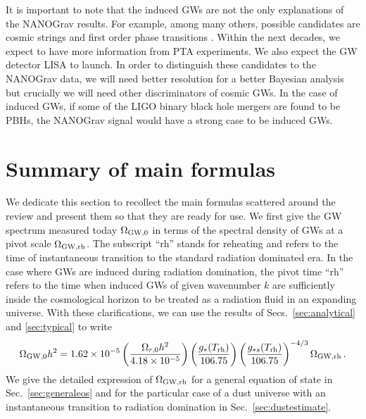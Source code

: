 \documentclass[a4paper,11pt]{article}
\numberwithin{equation}{section}
\begin{document}
It is important to note that the induced GWs are not the only explanations of the NANOGrav results. For example, among many others, possible candidates are cosmic strings \cite{Ellis:2020ena,Blasi:2020mfx,Buchmuller:2020lbh,Samanta:2020cdk} and first order phase transitions \cite{Nakai:2020oit,Addazi:2020zcj,Neronov:2020qrl,Ratzinger:2020koh,Bian:2020urb,Li:2020cjj,Liu:2020mru,Paul:2020wbz}. Within the next decades, we expect to have more information from PTA experiments. We also expect the GW detector LISA to launch. In order to distinguish these candidates to the NANOGrav data, we will need better resolution for a better Bayesian analysis \cite{Bian:2020urb} but crucially we will need other discriminators of cosmic GWs. In the case of induced GWs, if some of the LIGO binary black hole mergers are found to be PBHs, the NANOGrav signal would have a strong case to be induced GWs. 






\section{Summary of main formulas \label{sec:summary}}

We dedicate this section to recollect the main formulas scattered around the review and present them so that they are ready for use. We first give the GW spectrum measured today $\Omega_{\rm GW,0}$ in terms of the spectral density of GWs at a pivot scale $\Omega_{\rm GW,rh}$. The subscript ``rh'' stands for reheating and refers to the time of instantaneous transition to the standard radiation dominated era. In the case where GWs are induced during radiation domination, the pivot time ``rh'' refers to the time when induced GWs of given wavenumber $k$ are sufficiently inside the cosmological horizon to be treated as a radiation fluid in an expanding universe. With these clarifications, we can use the results of Secs.~\ref{sec:analytical} and \ref{sec:typical} to write
\begin{align}\label{eq:spectraldensitytoday3}
\Omega_{\rm GW,0}h^2=1.62\times 10^{-5}\left(\frac{\Omega_{r,0}h^2}{4.18\times 10^{-5}}\right)\left(\frac{g_*(T_{\rm rh})}{106.75}\right)\left(\frac{g_{*s}(T_{\rm rh})}{106.75}\right)^{-4/3}\Omega_{\rm GW,rh}\,.
\end{align}
We give the detailed expression of $\Omega_{\rm GW,rh}$ for a general equation of state in Sec.~\ref{sec:generaleos} and for the particular case of a dust universe with an instantaneous transition to radiation domination in Sec.~\ref{sec:dustestimate}.
\end{document}
